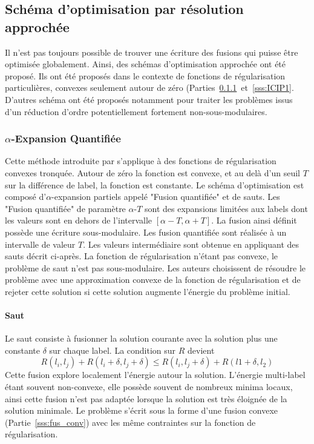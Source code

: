 \documentclass[../main/These_Mathias_Paget.tex]{subfiles}
\begin{document}
\subsection{Schéma d'optimisation par résolution approchée}

Il n'est pas toujours possible de trouver une écriture des fusions qui puisse être optimisée globalement. Ainsi, des schémas d'optimisation approchée ont été proposé. Ils ont été proposés dans le contexte de fonctions de régularisation particulières, convexes seulement autour de zéro (Parties~\ref{sss:anna}~et~\ref{sss:ICIP1}. D'autres schéma ont été proposés notamment pour traiter les problèmes issus d'un réduction d'ordre potentiellement fortement non-sous-modulaires.

\subsubsection{$\alpha$-Expansion Quantifiée}
	\label{sss:anna}
	Cette méthode introduite par \cite{Jezierska11CVPR} s'applique à des fonctions de régularisation convexes tronquée. Autour de zéro la fonction est convexe, et au delà d'un seuil $T$ sur la différence de label, la fonction est constante. Le schéma d'optimisation est composé d'$\alpha$-expansion partiels appelé "Fusion quantifiée" et de sauts. Les "Fusion quantifiée" de paramètre $\alpha$-$T$ sont des expansions limitées aux labels dont les valeurs sont en dehors de l'intervalle $[\alpha-T,\alpha +T]$. La fusion ainsi définit possède une écriture sous-modulaire. Les fusion quantifiée sont réalisée à un intervalle de valeur $T$. Les valeurs intermédiaire sont obtenue en appliquant des sauts décrit ci-après. La fonction de régularisation n'étant pas convexe, le problème de saut n'est pas sous-modulaire. Les auteurs choisissent de résoudre le problème avec une approximation convexe de la fonction de régularisation et de rejeter cette solution si cette solution augmente l’énergie du problème initial.
	
	
\paragraph*{Saut}
	Le saut consiste à fusionner la solution courante avec la solution plus une constante $\delta$ sur chaque label. La condition sur $R$ devient
	\begin{equation}
	R(l_i,l_j) + R(l_i+\delta,l_j+\delta) \leq R(l_i,l_j+\delta) + R(l1+\delta,l_2)	
	\end{equation}
Cette fusion explore localement l'énergie autour la solution. L’énergie multi-label étant souvent non-convexe, elle possède souvent de nombreux minima locaux, ainsi cette fusion n'est pas adaptée lorsque la solution est très éloignée de la solution minimale. Le problème s'écrit sous la forme d'une fusion convexe (Partie~\ref{sss:fus_conv}) avec les même contraintes sur la fonction de régularisation.
\end{document}
